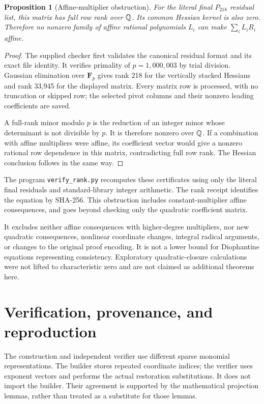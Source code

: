 \documentclass[10pt,letterpaper]{article}
\newtheorem{proposition}[theorem]{Proposition}
\theoremstyle{definition}\newtheorem{definition}[theorem]{Definition}
\begin{document}
\begin{proposition}[Affine-multiplier obstruction]\label{prop:rank}
For the literal final $P_{218}$ residual list, this matrix has full row
rank over $\mathbb Q$. Its common Hessian kernel is also zero. Therefore no
nonzero family of affine rational polynomials $L_i$ can make
$\sum_i L_iR_i$ affine.
\end{proposition}
\begin{proof}
The supplied checker first validates the canonical residual format and
its exact file identity. It verifies primality of $p=1,000,003$ by trial
division. Gaussian elimination over $\mathbf F_p$ gives rank 218 for the
vertically stacked Hessians and rank 33,945 for the displayed matrix.
Every matrix row is processed, with no truncation or skipped row; the
selected pivot columns and their nonzero leading coefficients are saved.

A full-rank minor modulo $p$ is the reduction of an integer minor whose
determinant is not divisible by $p$. It is therefore nonzero over $\mathbb Q$.
If a combination with affine multipliers were affine, its coefficient
vector would give a nonzero rational row dependence in this matrix,
contradicting full row rank. The Hessian conclusion follows in the same way.
\end{proof}

The program \texttt{verify\_rank.py} recomputes these certificates using
only the literal final residuals and standard-library integer arithmetic.
The rank receipt identifies the equation by SHA-256. This obstruction
includes constant-multiplier affine consequences, and goes beyond checking
only the quadratic coefficient matrix.

It excludes neither affine consequences with higher-degree multipliers,
nor new quadratic consequences, nonlinear coordinate changes, integral
radical arguments, or changes to the original proof encoding. It is not a
lower bound for Diophantine equations representing consistency. Exploratory
quadratic-closure calculations were not lifted to characteristic zero and
are not claimed as additional theorems here.

\section{Verification, provenance, and reproduction}
\label{sec:verification}

The construction and independent verifier use different sparse monomial
representations. The builder stores repeated coordinate indices; the
verifier uses exponent vectors and performs the actual restoration
substitutions. It does not import the builder. Their agreement is supported
by the mathematical projection lemmas, rather than treated as a substitute
for those lemmas.
\end{document}
